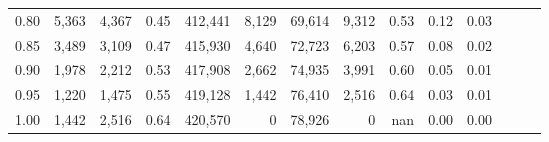 \begin{tabular}{rrrrrrrrrrrrrr}
0.80 &   5,363 &  4,367 &  0.45 &  412,441 &    8,129 &  69,614 &   9,312 &  0.53 &  0.12 &      0.03 \\
0.85 &   3,489 &  3,109 &  0.47 &  415,930 &    4,640 &  72,723 &   6,203 &  0.57 &  0.08 &      0.02 \\
0.90 &   1,978 &  2,212 &  0.53 &  417,908 &    2,662 &  74,935 &   3,991 &  0.60 &  0.05 &      0.01 \\
0.95 &   1,220 &  1,475 &  0.55 &  419,128 &    1,442 &  76,410 &   2,516 &  0.64 &  0.03 &      0.01 \\
1.00 &   1,442 &  2,516 &  0.64 &  420,570 &        0 &  78,926 &       0 &   nan &  0.00 &      0.00 \\
\bottomrule
\end{tabular}
